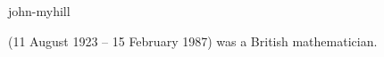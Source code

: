 \documentclass{stex}
\begin{document}
\begin{smodule}{john-myhill}
\begin{sparagraph}[style=symdoc]
   (11 August 1923 – 15 February 1987) was a British mathematician.
\end{sparagraph}
\end{smodule}
\end{document}
